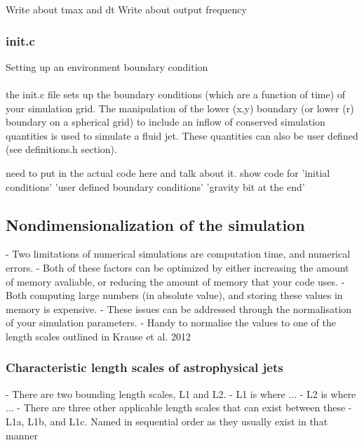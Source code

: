 \documentclass[12pt]{article}
\begin{document}
Write about tmax and dt
Write about output frequency
\subsubsection{init.c}
Setting up an environment
boundary condition\\
\\
the init.c file sets up the boundary conditions (which are a function of time) of your simulation grid. The manipulation of the lower (x,y) boundary (or lower (r) boundary on a spherical grid) to include an inflow of conserved simulation quantities is used to simulate a fluid jet. These quantities can also be user defined (see definitions.h section).

need to put in the actual code here and talk about it. show code for
'initial conditions'
'user defined boundary conditions'
'gravity bit at the end'

\subsection{Nondimensionalization of the simulation}
- Two limitations of numerical simulations are computation time, and numerical errors. 
- Both of these factors can be optimized by either increasing the amount of memory avaliable, or reducing the amount of memory that your code uses.
- Both computing large numbers (in absolute value), and storing these values in memory is expensive.
- These issues can be addressed through the normalisation of your simulation parameters.
- Handy to normalise the values to one of the length scales outlined in Krause et al. 2012

\subsubsection{Characteristic length scales of astrophysical jets}
- There are two bounding length scales, L1 and L2.
- L1 is where ...
- L2 is where ...
- There are three other applicable length scales that can exist between these - L1a, L1b, and L1c. Named in sequential order as they usually exist in that manner
\end{document}
